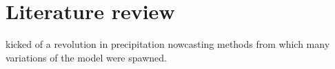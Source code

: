 \chapter{Literature review} \label{sec:Literature review}

\cite{shi2015convolutional} kicked of a revolution in precipitation nowcasting methods from which many variations of the model were spawned.